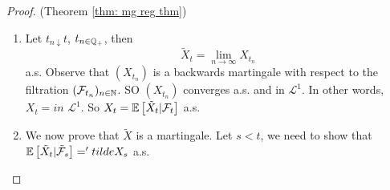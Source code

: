 \documentclass{article}
\begin{document}
\begin{proof}{(Theorem \ref{thm: mg reg thm})}
\begin{enumerate}
	 Let $ a<b$, $ a,b \in \Q_{+}$, $ I\subseteq \Q_{+}$, bounded. Observe that
	\[
		\mathcal{N}([a,b], I, X) = \displaystyle\sup_{I \subseteq I, J \text{ finite}} \mathcal{N}([a,b], J, X).
	\]
	Now, let $ J = \{j_{1}, \cdots, j_{n}\}\subseteq I$ with $ j_{1}<\cdots j_{n}$ and $ k>\displaystyle\sup I$. Then $ (X_{t})_{t\in J}$ is a discrete time martingale. Now, Doob's upcrossing inequality from \ref{lemma: doob upcrossing} gives
	\[
	\begin{array}{ll}
		(b-a)\cdot \mathbb{E}\left[ \mathcal{N}([a,b], J, X) \right] &\leq \mathbb{E}\left[ (X_{j_{n}}-a)^{-} \right] \\
	     &\leq \mathbb{E}\left[ (X_{k}-a)^{-} \right].
	\end{array}
	\]
	By monotone convergence, we get 
\[
(b-a)\cdot \mathbb{E}\left[ \mathcal{N}([a,b], I, X) \right]<\infty.
	\]
	Let $ M\in \N$, $ I_{M} = \Q_{+}\cap [0,M]$ and 
 \[
	 \Omega_{0} = \displaystyle\bigcap_{m\in\N} \left( \displaystyle\bigcap_{a<b, a,b\in\Q} \{ \mathcal{N}([a,b], I_{M}, X)<\infty\} \bigcup \left\{ \displaystyle\sup_{t\in I_{m}} |X_{t}|<\infty \right\}\right).
 \]
 On $ \Omega_{0}$, from lemma \ref{lemma: mg reg lemma}, $ \lim_{s \downarrow tX_{s}} $ exists and we have $\PP(\Omega_{0})=1$. Now, define 
 \[
	 \tilde{X}_{t} = \left\lbrace
\begin{array}{@{}l@{}}
	\lim_{s\downarrow t, s\in \Q_{+}} X_{s}, \quad \text{ on }\Omega_{0}    \\
	0 , \quad\quad\quad\quad\quad \text{ otherwise}. 
\end{array}\right. 
 \]
 Recall $ \tilde{\F}_{t} = \sigma(\F_{t}, \mathcal{N})$ for all $ t\geq 0$. From the definition definition, we see that $ \tilde{X}$ is $ \tilde{\F}-$adapted.\\ 

 It remains to show that $X_{t} =  \mathbb{E}\left[ \tilde{X}_{t}|\F_{t} \right]$ a.s. and $ \tilde{X}$ is cadlag and a martingale. 

\item Let $ t_{n\downarrow} t$, $ t_{n\in \mathbb{Q}_{+}}$, then 
	\[
		\tilde{X}_{t} = \lim_{n\to \infty}X_{t_{n}} 
	\]
	a.s. Observe that $ (X_{t_{n}})$ is a backwards martingale with respect to the filtration $ (\mathcal{F}_{t_{n}})_{n\in \mathbb{N}}$. SO $ (X_{t_{n}})$ converges a.s. and in $ \mathcal{L}^{1} $. In other words, $ X_{t } = in $ $\mathcal{L}^{1} $. So $ X_{t} = \mathbb{E}\left[ \tilde{X}_{t}|\F_{t}\right]$ a.s.

\item We now prove that $ \tilde{X}$ is a martingale. Let $ s<t$, we need to show that $ \mathbb{E}\left[ \tilde{X}_{t}|\tilde{\mathcal{F}}_{s} \right] = 'tilde{X}_{s}$ a.s.\\ 


\end{enumerate}
\end{proof}
\end{document}

